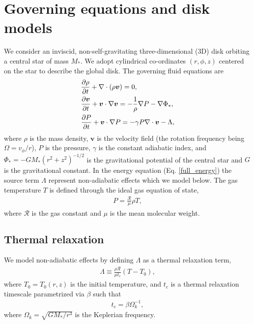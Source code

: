 \section{Governing equations and disk models}\label{setup}
We consider  an inviscid, non-self-gravitating three-dimensional (3D)
disk orbiting a central star of mass $M_*$. We adopt cylindrical
co-ordinates $(r,\phi, z)$ centered on the star to describe the global
disk. The governing fluid equations are
\begin{align}
  &\frac{\p\rho}{\p t} + \nabla\cdot{\left(\rho\bm{v}\right)} = 0,\\
  &\frac{\p\bm{v}}{\p t} + \bm{v}\cdot\nabla\bm{v} =
  -\frac{1}{\rho}\nabla P - \nabla\Phi_*,\\
  &\frac{\p P}{\p t} + \bm{v}\cdot\nabla P  = - \gamma P
  \nabla\cdot\bm{v} - \Lambda %
  , \label{full_energy}
\end{align}
where $\rho$ is the mass density, $\bm{v}$ is the velocity field (the
rotation frequency being $\Omega=v_\phi/r$), $P$
is the pressure, $\gamma$ is the constant adiabatic index, and $\Phi_*
= -GM_*(r^2 + z^2)^{-1/2}$ is the gravitational potential of the
central star and $G$ is the gravitational constant. 
In the energy equation (Eq. \ref{full_energy}) the source term
$\Lambda$ represent non-adiabatic effects which we
model below. The gas temperature $T$ is defined through the ideal gas 
equation of state,  
\begin{align}
P = \frac{\mathcal{R}}{\mu}\rho T,
\end{align}
where $\mathcal{R}$ is the gas constant and $\mu$ is the mean molecular
weight.    

\subsection{Thermal relaxation}
We model non-adiabatic effects by defining $\Lambda$ as a thermal
relaxation term,
\begin{align}\label{thermal_relax}
  \Lambda  \equiv \frac{\rho\mathcal{R}}{\mu t_c}\left(T - T_0\right),
\end{align}
where $T_0=T_0(r,z)$ is the initial temperature, and $t_c$ is a
thermal relaxation timescale parametrized via $\beta$ such that 
\begin{align}\label{beta_def}
  t_c = \beta \Omega_k^{-1},
\end{align}
where $\Omega_k=\sqrt{GM_*/r^3}$ is the Keplerian frequency.   


